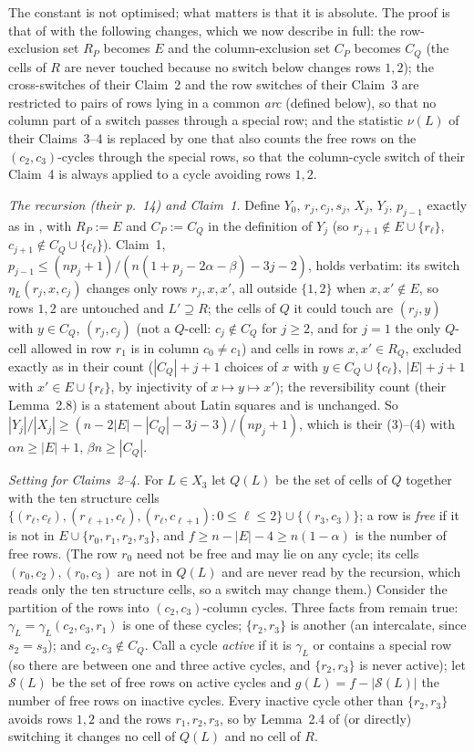 The constant is not optimised; what matters is that it is absolute.
The proof is that of \cite{AM26} with the following changes, which we
now describe in full: the row-exclusion set $R_P$ becomes $E$ and the
column-exclusion set $C_P$ becomes $C_Q$ (the cells of $R$ are never
touched because no switch below changes rows $1,2$); the cross-switches
of their Claim~2 and the row switches of their Claim~3 are restricted
to pairs of rows lying in a common \emph{arc} (defined below), so that
no column part of a switch passes through a special row; and the
statistic $\nu(L)$ of their Claims~3--4 is replaced by one that also
counts the free rows on the $(c_2,c_3)$-cycles through the special
rows, so that the column-cycle switch of their Claim~4 is always
applied to a cycle avoiding rows $1,2$.

\emph{The recursion (their p.~14) and Claim~1.}  Define $Y_0$, $r_j,c_j,s_j$,
$X_j$, $Y_j$, $p_{j-1}$ exactly as in \cite{AM26}, with
$R_P:=E$ and $C_P:=C_Q$ in the definition of $Y_j$ (so
$r_{j+1}\notin E\cup\{r_\ell\}$, $c_{j+1}\notin C_Q\cup\{c_\ell\}$).
Claim~1, $p_{j-1}\le(np_j+1)/(n(1+p_j-2\alpha-\beta)-3j-2)$, holds
verbatim: its switch $\eta_L(r_j,x,c_j)$ changes only rows $r_j,x,x'$,
all outside $\{1,2\}$ when $x,x'\notin E$, so rows $1,2$ are untouched
and $L'\supseteq R$; the cells of $Q$ it could touch are $(r_j,y)$ with
$y\in C_Q$, $(r_j,c_j)$ (not a $Q$-cell: $c_j\notin C_Q$ for $j\ge2$,
and for $j=1$ the only $Q$-cell allowed in row $r_1$ is in column
$c_0\ne c_1$) and cells in rows $x,x'\in R_Q$, excluded exactly as in
their count ($|C_Q|+j+1$ choices of $x$ with $y\in C_Q\cup\{c_\ell\}$,
$|E|+j+1$ with $x'\in E\cup\{r_\ell\}$, by injectivity of
$x\mapsto y\mapsto x'$); the reversibility count (their Lemma~2.8) is a
statement about Latin squares and is unchanged.  So
$|Y_j|/|X_j|\ge(n-2|E|-|C_Q|-3j-3)/(np_j+1)$, which is their (3)--(4)
with $\alpha n\ge|E|+1$, $\beta n\ge|C_Q|$.

\emph{Setting for Claims~2--4.}  For $L\in X_3$ let $Q(L)$ be the set of
cells of $Q$ together with the ten structure cells
$\{(r_\ell,c_\ell),(r_{\ell+1},c_\ell),(r_\ell,c_{\ell+1}):0\le\ell\le2\}\cup\{(r_3,c_3)\}$;
a row is \emph{free} if it is not in $E\cup\{r_0,r_1,r_2,r_3\}$, and
$f\ge n-|E|-4\ge n(1-\alpha)$ is the number of free rows.  (The row
$r_0$ need not be free and may lie on any cycle; its cells
$(r_0,c_2),(r_0,c_3)$ are not in $Q(L)$ and are never read by the
recursion, which reads only the ten structure cells, so a switch may
change them.)
Consider the partition of the rows into $(c_2,c_3)$-column cycles.  Three
facts from \cite{AM26} remain true: $\gamma_L=\gamma_L(c_2,c_3,r_1)$ is
one of these cycles; $\{r_2,r_3\}$ is another (an intercalate, since
$s_2=s_3$); and $c_2,c_3\notin C_Q$.  Call a cycle \emph{active} if it
is $\gamma_L$ or contains a special row (so there are between one and
three active cycles, and $\{r_2,r_3\}$ is never active); let
$\mathcal S(L)$ be the set of free rows on active cycles and
$g(L)=f-|\mathcal S(L)|$ the number of free rows on inactive cycles.
Every inactive cycle other than $\{r_2,r_3\}$ avoids rows $1,2$ and
the rows $r_1,r_2,r_3$, so by Lemma~2.4 of \cite{AM26} (or directly)
switching it changes no cell of $Q(L)$ and no cell of $R$.

